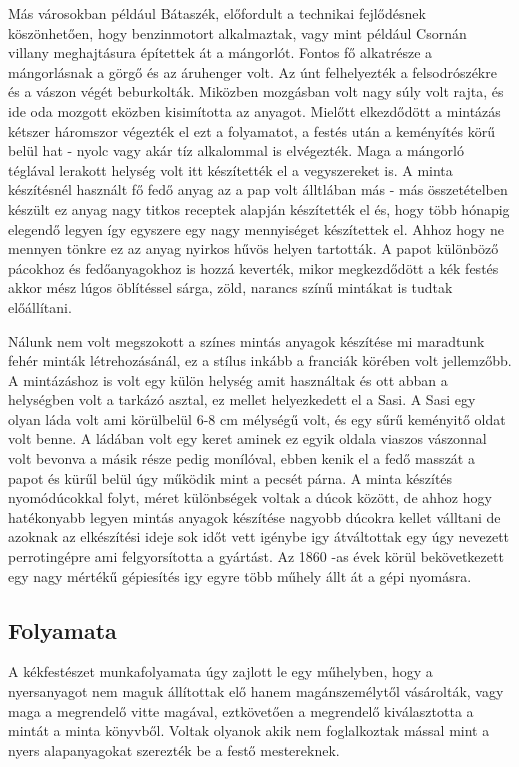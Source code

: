 \documentclass[fontsize=12pt, appendixprefix=true]{scrreprt}
\begin{document}
Más városokban például Bátaszék, előfordult a technikai fejlődésnek köszönhetően, hogy benzinmotort alkalmaztak, vagy mint például Csornán villany meghajtásura építettek át a mángorlót. Fontos fő alkatrésze a mángorlásnak a görgő és az áruhenger volt. Az únt felhelyezték a felsodrószékre és a vászon végét beburkolták. Miközben mozgásban volt nagy súly volt rajta, és ide oda mozgott eközben kisimította az anyagot. Mielőtt elkezdődött a mintázás kétszer háromszor végezték el ezt a folyamatot, a festés után a keményítés körű belül hat - nyolc  vagy akár tíz alkalommal is elvégezték. Maga a mángorló téglával lerakott helység volt itt készítették el a vegyszereket is. 
A minta készítésnél használt fő fedő anyag az a pap volt álltlában más - más összetételben készült ez anyag nagy titkos receptek alapján készítették el és, hogy több hónapig elegendő legyen így egyszere egy nagy mennyiséget készítettek el.  Ahhoz hogy ne mennyen tönkre ez az anyag nyirkos hűvös helyen tartották. A papot különböző  pácokhoz és fedőanyagokhoz is hozzá keverték, mikor megkezdődött a kék festés akkor mész lúgos öblítéssel sárga, zöld, narancs színű mintákat is tudtak előállítani.

Nálunk nem volt megszokott a  színes mintás anyagok készítése mi maradtunk fehér minták létrehozásánál, ez a stílus inkább a franciák körében volt jellemzőbb. A mintázáshoz is volt egy külön helység amit használtak és ott abban a helységben volt a tarkázó asztal, ez mellet helyezkedett el a Sasi.
A Sasi egy olyan láda volt ami körülbelül 6-8 cm mélységű volt, és egy sűrű keményitő oldat volt benne. A ládában volt egy keret aminek ez egyik oldala viaszos vászonnal volt bevonva a másik része pedig monílóval, ebben kenik el a fedő masszát a papot és kürűl belül úgy működik mint a pecsét párna.
A minta készítés nyomódúcokkal folyt, méret különbségek voltak a dúcok között, de ahhoz hogy hatékonyabb legyen mintás anyagok készítése nagyobb dúcokra kellet válltani de azoknak az elkészítési ideje sok időt vett igénybe igy átváltottak egy úgy nevezett perrotingépre ami  felgyorsította a gyártást. Az 1860 -as évek körül bekövetkezett egy nagy mértékű gépiesítés igy egyre több műhely állt át a gépi nyomásra.


\subsection{Folyamata}

A kékfestészet munkafolyamata úgy zajlott le egy műhelyben, hogy a nyersanyagot nem maguk állítottak elő hanem magánszemélytől vásárolták,  vagy maga a megrendelő vitte magával, eztkövetően a megrendelő kiválasztotta a mintát a minta könyvből. 
Voltak olyanok akik nem foglalkoztak mással mint a nyers alapanyagokat szerezték be a festő mestereknek.
\end{document}
